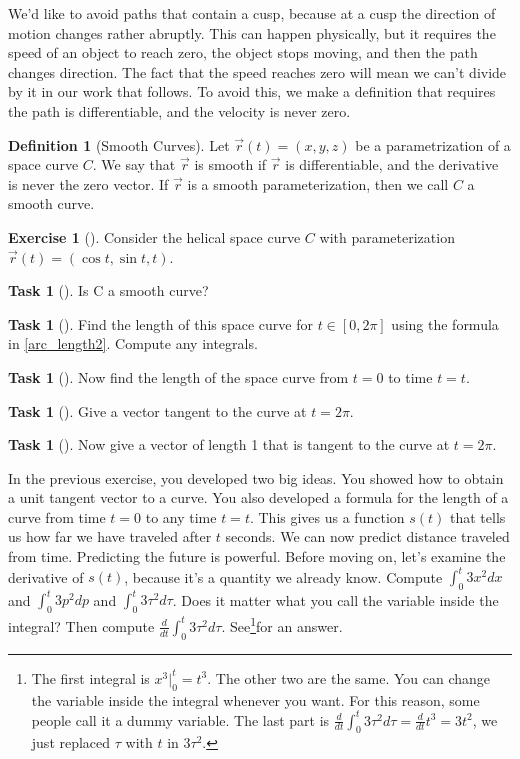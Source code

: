 \documentclass[10pt,]{book}
\theoremstyle{plain}
\theoremstyle{definition}
\newtheorem{definition}[theorem]{Definition}
\theoremstyle{definition}
\theoremstyle{definition}
\theoremstyle{definition}
\newtheorem{exploration}[project]{Exercise}
\newtheorem{task}[project]{Task}
\theoremstyle{definition}
\numberwithin{equation}{section}
\newcommand{\ds}{\displaystyle}
\begin{document}
We'd like to avoid paths that contain a cusp, because at a cusp the direction of motion changes rather abruptly. This can happen physically, but it requires the speed of an object to reach zero, the object stops moving, and then the path changes direction. The fact that the speed reaches zero will mean we can't divide by it in our work that follows. To avoid this, we make a definition that requires the path is differentiable, and the velocity is never zero.%
\begin{definition}[{Smooth Curves}]\label{def_smooth_curve}
Let \(\vec r(t)=(x,y,z)\) be a parametrization of a space curve \(C\). We say that \(\vec r\) is smooth if \(\vec r\) is differentiable, and the derivative is never the zero vector. If \(\vec r\) is a smooth parameterization, then we call \(C\) a smooth curve.%
\end{definition}
\begin{exploration}[]\label{prob_basic_helix}
Consider the helical space curve \(C\) with parameterization \(\vec r(t)=(\cos t, \sin t, t)\).%
\begin{task}[]\label{task-386}
Is C a smooth curve?%
\end{task}
\begin{task}[]\label{task-387}
Find the length of this space curve for \(t\in[0,2\pi]\) using the formula in \hyperref[arc_length2]{\ref{arc_length2}}. Compute any integrals.%
\end{task}
\begin{task}[]\label{task-388}
Now find the length of the space curve from \(t=0\) to time \(t=t\).%
\end{task}
\begin{task}[]\label{task-389}
Give a vector tangent to the curve at \(t=2\pi\).%
\end{task}
\begin{task}[]\label{task-390}
Now give a vector of length 1 that is tangent to the curve at \(t=2\pi\).%
\end{task}
\end{exploration}
In the previous exercise, you developed two big ideas. You showed how to obtain a unit tangent vector to a curve. You also developed a formula for the length of a curve from time \(t=0\) to any time \(t=t\). This gives us a function \(s(t)\) that tells us how far we have traveled after \(t\) seconds. We can now predict distance traveled from time. Predicting the future is powerful. Before moving on, let's examine the derivative of \(s(t)\), because it's a quantity we already know.%
Compute \(\ds \int_0^t 3x^2 dx\) and \(\ds \int_0^t 3p^2 dp\) and \(\ds \int_0^t 3\tau^2 d\tau\). Does it matter what you call the variable inside the integral? Then compute \(\ds\frac{d}{dt} \int_0^t 3\tau^2 d\tau\). See\footnote{The first integral is \(x^3|_0^t = t^3\). The other two are the same. You can change the variable inside the integral whenever you want.  For this reason, some people call it a dummy variable. The last part is \(\ds\frac{d}{dt} \int_0^t 3\tau^2 d\tau = \frac{d}{dt} t^3 = 3t^2\), we just replaced \(\tau\) with \(t\) in \(3\tau^2\).\label{fn-9}}for an answer.%
\end{document}

